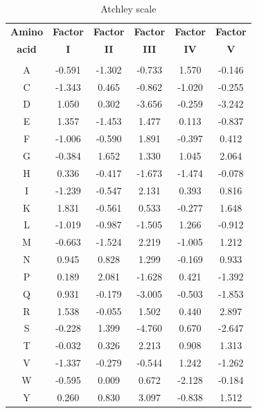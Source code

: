 \pagebreak

\begin{table}[h!]
    \centering
    \setlength{\tabcolsep}{1.2em}
    \fontsize{12pt}{12pt}\selectfont
    \begin{tabular}{c c c c c c}
        \textbf{Amino} & \textbf{Factor} & \textbf{Factor} & \textbf{Factor} & \textbf{Factor} & \textbf{Factor} \\
        \textbf{acid} & \textbf{I} & \textbf{II} & \textbf{III} & \textbf{IV} & \textbf{V} \\
        \hline
        \\
         A & -0.591 & -1.302 & -0.733 & 1.570 & -0.146 \\ 
         C & -1.343 & 0.465 & -0.862 & -1.020 & -0.255 \\
         D & 1.050 & 0.302 & -3.656 & -0.259 & -3.242 \\
         E & 1.357 & -1.453 & 1.477 & 0.113 & -0.837 \\
         F & -1.006 & -0.590 & 1.891 & -0.397 & 0.412 \\
         G & -0.384 & 1.652 & 1.330 & 1.045 & 2.064 \\
         H & 0.336 & -0.417 & -1.673 & -1.474 & -0.078 \\
         I & -1.239 & -0.547 & 2.131 & 0.393 & 0.816 \\
         K & 1.831 & -0.561 & 0.533 & -0.277 & 1.648 \\
         L & -1.019 & -0.987 & -1.505 & 1.266 & -0.912 \\
         M & -0.663 & -1.524 & 2.219 & -1.005 & 1.212 \\
         N & 0.945 & 0.828 & 1.299 & -0.169 & 0.933 \\
         P & 0.189 & 2.081 & -1.628 & 0.421 & -1.392 \\
         Q & 0.931 & -0.179 & -3.005 & -0.503 & -1.853 \\
         R & 1.538 & -0.055 & 1.502 & 0.440 & 2.897 \\
         S & -0.228 & 1.399 & -4.760 & 0.670 & -2.647 \\
         T & -0.032 & 0.326 & 2.213 & 0.908 & 1.313 \\
         V & -1.337 & -0.279 & -0.544 & 1.242 & -1.262 \\
         W & -0.595 & 0.009 & 0.672 & -2.128 & -0.184 \\
         Y & 0.260 & 0.830 & 3.097 & -0.838 & 1.512 \\
    \end{tabular}
    \caption{Atchley scale}
\end{table}


